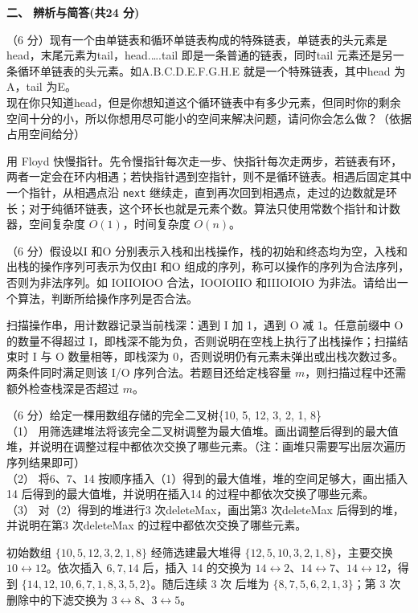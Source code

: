 \textbf{二、 辨析与简答(共24 分)}
\begin{question}
（6 分）现有一个由单链表和循环单链表构成的特殊链表，单链表的头元素是head，末尾元素为tail，head.….tail 即是一条普通的链表，同时tail 元素还是另一条循环单链表的头元素。如A.B.C.D.E.F.G.H.E 就是一个特殊链表，其中head 为A，tail 为E。\\
现在你只知道head，但是你想知道这个循环链表中有多少元素，但同时你的剩余空间十分的小，所以你想用尽可能小的空间来解决问题，请问你会怎么做？（依据占用空间给分）
\begin{solution}
用 Floyd 快慢指针。先令慢指针每次走一步、快指针每次走两步，若链表有环，两者一定会在环内相遇；若快指针遇到空指针，则不是循环链表。相遇后固定其中一个指针，从相遇点沿 \texttt{next} 继续走，直到再次回到相遇点，走过的边数就是环长；对于纯循环链表，这个环长也就是元素个数。算法只使用常数个指针和计数器，空间复杂度 $O(1)$，时间复杂度 $O(n)$。
\end{solution}
\end{question}

\begin{question}
（6 分）假设以I 和O 分别表示入栈和出栈操作，栈的初始和终态均为空，入栈和出栈的操作序列可表示为仅由I 和O 组成的序列，称可以操作的序列为合法序列，否则为非法序列。如 IOIIOIOO 合法，IOOIOIIO 和IIIOIOIO 为非法。请给出一个算法，判断所给操作序列是否合法。
\begin{solution}
扫描操作串，用计数器记录当前栈深：遇到 I 加 1，遇到 O 减 1。任意前缀中 O 的数量不得超过 I，即栈深不能为负，否则说明在空栈上执行了出栈操作；扫描结束时 I 与 O 数量相等，即栈深为 0，否则说明仍有元素未弹出或出栈次数过多。两条件同时满足则该 I/O 序列合法。若题目还给定栈容量 $m$，则扫描过程中还需额外检查栈深是否超过 $m$。
\end{solution}
\end{question}

\begin{question}
（6 分）给定一棵用数组存储的完全二叉树\{10, 5, 12, 3, 2, 1, 8\}\\
（1） 用筛选建堆法将该完全二叉树调整为最大值堆。画出调整后得到的最大值堆，并说明在调整过程中都依次交换了哪些元素。（注：画堆只需要写出层次遍历序列结果即可）\\
（2） 将6、7、14 按顺序插入（1）得到的最大值堆，堆的空间足够大，画出插入14 后得到的最大值堆，并说明在插入14 的过程中都依次交换了哪些元素。\\
（3） 对（2）得到的堆进行3 次deleteMax，画出第3 次deleteMax 后得到的堆，并说明在第3 次deleteMax 的过程中都依次交换了哪些元素。
\begin{solution}
初始数组 $\{10,5,12,3,2,1,8\}$ 经筛选建最大堆得 $\{12,5,10,3,2,1,8\}$，主要交换 $10\leftrightarrow12$。依次插入 $6,7,14$ 后，插入 14 的交换为 $14\leftrightarrow2$、$14\leftrightarrow7$、$14\leftrightarrow12$，得到 $\{14,12,10,6,7,1,8,3,5,2\}$。随后连续 3 次 \texttt{} 后堆为 $\{8,7,5,6,2,1,3\}$；第 3 次删除中的下滤交换为 $3\leftrightarrow8$、$3\leftrightarrow5$。
\end{solution}
\end{question}

